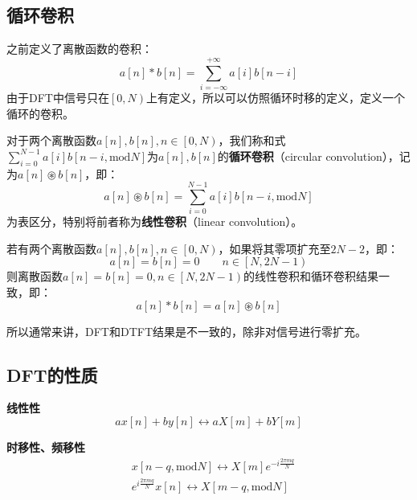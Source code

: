 \subsection{循环卷积}

之前定义了离散函数的卷积：
\[
a\left[ n \right] \ast b\left[ n \right] =\sum_{i=-\infty}^{+\infty}{a\left[ i \right] b\left[ n-i \right]}
\]
由于DFT中信号只在$\left[ 0,N \right) $上有定义，所以可以仿照循环时移的定义，定义一个循环的卷积。

\begin{definition}[循环卷积]
对于两个离散函数$a\left[ n \right] ,b\left[ n \right] ,n\in \left[ 0,N \right) $，我们称和式$\sum_{i=0}^{N-1}{a\left[ i \right] b\left[ n-i,\mathrm{mod}N \right]}$为$a\left[ n \right] ,b\left[ n \right] $的{\bf 循环卷积}（circular convolution），记为$a\left[ n \right] \circledast b\left[ n \right] $，即：
\[
a\left[ n \right] \circledast b\left[ n \right] =\sum_{i=0}^{N-1}{a\left[ i \right] b\left[ n-i,\mathrm{mod}N \right]}
\]
为表区分，特别将前者称为{\bf 线性卷积}（linear convolution）。
\end{definition}

\begin{theorem}[卷积相等定理]
若有两个离散函数$a\left[ n \right] ,b\left[ n \right] ,n\in \left[ 0,N \right) $，如果将其零项扩充至$2N-2$，即：
\[
a\left[ n \right] =b\left[ n \right] =0 \qquad n\in \left[ N,2N-1 \right)
\]
则离散函数$a\left[ n \right] =b\left[ n \right] =0,n\in \left[ N,2N-1 \right) $的线性卷积和循环卷积结果一致，即：
\[
a\left[ n \right] \ast b\left[ n \right] =a\left[ n \right] \circledast b\left[ n \right]
\]
\end{theorem}

所以通常来讲，DFT和DTFT结果是不一致的，除非对信号进行零扩充。

\subsection{DFT的性质}

{\bf 线性性}
\[
ax\left[ n \right] +by\left[ n \right] \leftrightarrow aX\left[ m \right] +bY\left[ m \right]
\]

{\bf 时移性、频移性}
\begin{align*}
&x\left[ n-q,\mathrm{mod}N \right] \leftrightarrow X\left[ m \right] e^{-i\frac{2\pi mq}{N}} \\
&e^{i\frac{2\pi mq}{N}}x\left[ n \right] \leftrightarrow X\left[ m-q,\mathrm{mod}N \right]
\end{align*}

